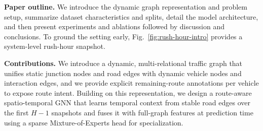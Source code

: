 \noindent\textbf{Paper outline.} We introduce the dynamic graph representation and problem setup, summarize dataset characteristics and splits, detail the model architecture, and then present experiments and ablations followed by discussion and conclusions. To ground the setting early, Fig.~\ref{fig:rush-hour-intro} provides a system-level rush-hour snapshot.

\noindent\textbf{Contributions.} We introduce a dynamic, multi-relational traffic graph that unifies static junction nodes and road edges with dynamic vehicle nodes and interaction edges, and we provide explicit remaining-route annotations per vehicle to expose route intent. Building on this representation, we design a route-aware spatio-temporal GNN that learns temporal context from stable road edges over the first $H{-}1$ snapshots and fuses it with full-graph features at prediction time using a sparse Mixture-of-Experts head for specialization. 

